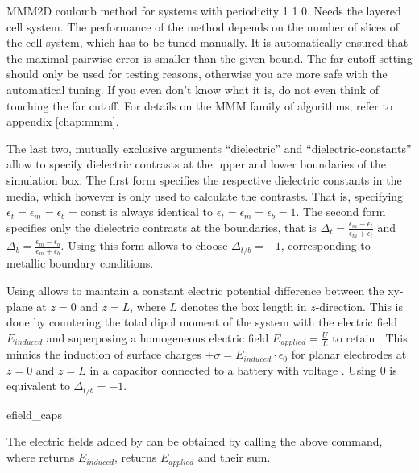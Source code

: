 MMM2D coulomb method for systems with periodicity 1 1 0. Needs the
layered cell system. The performance of the method depends on the
number of slices of the cell system, which has to be tuned manually.
It is automatically ensured that the maximal pairwise error is smaller
than the given bound. The far cutoff setting should only be used for
testing reasons, otherwise you are more safe with the automatical
tuning. If you even don't know what it is, do not even think of
touching the far cutoff. For details on the MMM family of algorithms,
refer to appendix \vref{chap:mmm}.

The last two, mutually exclusive arguments ``dielectric'' and
``dielectric-constants'' allow to specify dielectric contrasts at the
upper and lower boundaries of the simulation box. The first form
specifies the respective dielectric constants in the media, which
however is only used to calculate the contrasts. That is, specifying 
$\epsilon_t=\epsilon_m=\epsilon_b=\text{const}$ is always identical to
$\epsilon_t=\epsilon_m=\epsilon_b=1$. The second form specifies only
the dielectric contrasts at the boundaries, that is
$\Delta_t=\frac{\epsilon_m-\epsilon_t}{\epsilon_m+\epsilon_t}$ and
$\Delta_b=\frac{\epsilon_m-\epsilon_b}{\epsilon_m+\epsilon_b}$. Using
this form allows to choose $\Delta_{t/b}=-1$, corresponding to
metallic boundary conditions.

Using   allows to maintain a constant 
electric potential difference  between the xy-plane at $z=0$ 
and $z=L$, where $L$ denotes the box length in $z$-direction.
This is done by countering the total dipol moment of
the system with the electric field $E_{induced}$ and superposing 
a homogeneous electric field $E_{applied} = \frac{U}{L}$ 
to retain . This mimics the induction of surface charges
$\pm\sigma = E_{induced} \cdot \epsilon_0$ for planar electrodes at $z=0$ 
and $z=L$ in a capacitor connected to a battery with voltage .
Using  0 is equivalent to $\Delta_{t/b}=-1$.

\begin{essyntax}
  efield_caps 
  \begin{features}
  \end{features}
\end{essyntax}

The electric fields added by   can be obtained 
by calling the above command, where  returns $E_{induced}$,
 returns $E_{applied}$ and  their sum.

